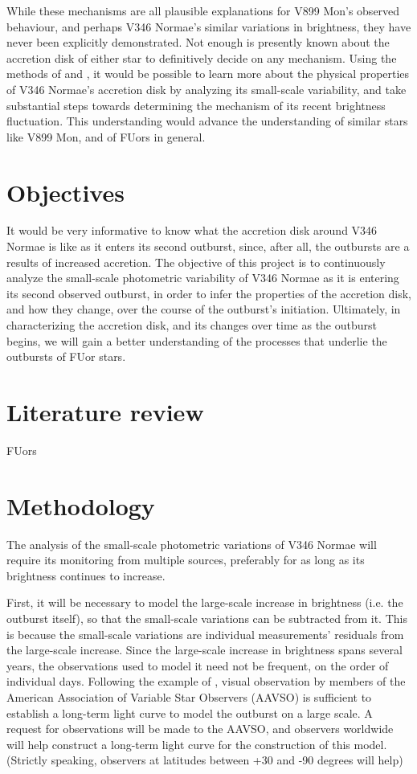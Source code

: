 \documentclass[iop,apj,tighten]{emulateapj}
\begin{document}
While these mechanisms are all plausible explanations for V899 Mon's observed behaviour, and perhaps V346 Normae's similar variations in brightness, they have never been explicitly demonstrated. Not enough is presently known about the accretion disk of either star to definitively decide on any mechanism. Using the methods of \cite{kenyon_flickering_2000} and \cite{siwak_photometric_2013}, it would be possible to learn more about the physical properties of V346 Normae's accretion disk by analyzing its small-scale variability, and take substantial steps towards determining the mechanism of its recent brightness fluctuation. This understanding would advance the understanding of similar stars like V899 Mon, and of FUors in general.

\section{Objectives}
It would be very informative to know what the accretion disk around V346 Normae is like as it enters its second outburst, since, after all, the outbursts are a results of increased accretion. The objective of this project is to continuously analyze the small-scale photometric variability of V346 Normae as it is entering its second observed outburst, in order to infer the properties of the accretion disk, and how they change, over the course of the outburst's initiation. Ultimately, in characterizing the accretion disk, and its changes over time as the outburst begins, we will gain a better understanding of the processes that underlie the outbursts of FUor stars.

\section{Literature review}
FUors

\section{Methodology}
The analysis of the small-scale photometric variations of V346 Normae will require its monitoring from multiple sources, preferably for as long as its brightness continues to increase. 

First, it will be necessary to model the large-scale increase in brightness (i.e. the outburst itself), so that the small-scale variations can be subtracted from it. This is because the small-scale variations are individual measurements' residuals from the large-scale increase. Since the large-scale increase in brightness spans several years, the observations used to model it need not be frequent, on the order of individual days. Following the example of \cite{kenyon_flickering_2000}, visual observation by members of the American Association of Variable Star Observers (AAVSO) is sufficient to establish a long-term light curve to model the outburst on a large scale. A request for observations will be made to the AAVSO, and observers worldwide will help construct a long-term light curve for the construction of this model. (Strictly speaking, observers at latitudes between +30 and -90 degrees will help)
\end{document}
